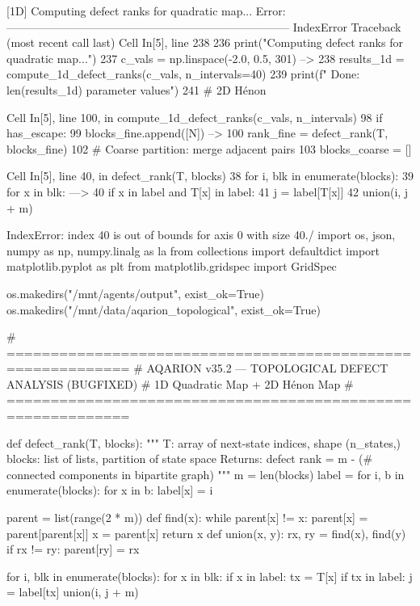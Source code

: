 {{{{{{{{{{{{{[1D] Computing defect ranks for quadratic map...
Error:
---------------------------------------------------------------------------
IndexError                                Traceback (most recent call last)
Cell In[5], line 238
    236 print("\n[1D] Computing defect ranks for quadratic map...")
    237 c_vals = np.linspace(-2.0, 0.5, 301)
--> 238 results_1d = compute_1d_defect_ranks(c_vals, n_intervals=40)
    239 print(f"  Done: {len(results_1d)} parameter values")
    241 # 2D Hénon

Cell In[5], line 100, in compute_1d_defect_ranks(c_vals, n_intervals)
     98 if has_escape:
     99     blocks_fine.append([N])
--> 100 rank_fine = defect_rank(T, blocks_fine)
    102 # Coarse partition: merge adjacent pairs
    103 blocks_coarse = []

Cell In[5], line 40, in defect_rank(T, blocks)
     38 for i, blk in enumerate(blocks):
     39     for x in blk:
---> 40         if x in label and T[x] in label:
     41             j = label[T[x]]
     42             union(i, j + m)

IndexError: index 40 is out of bounds for axis 0 with size 40./
import os, json, numpy as np, numpy.linalg as la
from collections import defaultdict
import matplotlib.pyplot as plt
from matplotlib.gridspec import GridSpec

os.makedirs("/mnt/agents/output", exist_ok=True)
os.makedirs("/mnt/data/aqarion_topological", exist_ok=True)

# ============================================================
# AQARION v35.2 — TOPOLOGICAL DEFECT ANALYSIS (BUGFIXED)
# 1D Quadratic Map + 2D Hénon Map
# ============================================================

def defect_rank(T, blocks):
    """
    T: array of next-state indices, shape (n_states,)
    blocks: list of lists, partition of state space
    Returns: defect rank = m - (# connected components in bipartite graph)
    """
    m = len(blocks)
    label = {}
    for i, b in enumerate(blocks):
        for x in b:
            label[x] = i
    
    parent = list(range(2 * m))
    def find(x):
        while parent[x] != x:
            parent[x] = parent[parent[x]]
            x = parent[x]
        return x
    def union(x, y):
        rx, ry = find(x), find(y)
        if rx != ry:
            parent[ry] = rx
    
    for i, blk in enumerate(blocks):
        for x in blk:
            if x in label:
                tx = T[x]
                if tx in label:
                    j = label[tx]
                    union(i, j + m)
    
}}}}}}}}}}}}}
